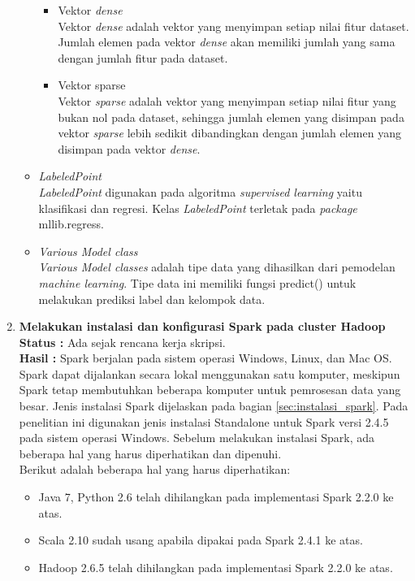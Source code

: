 \documentclass[a4paper,twoside]{article}
\begin{document}
\begin{enumerate}
\begin{itemize}
\begin{itemize}
\item Vektor \textit{dense}\\
Vektor \textit{dense} adalah vektor yang menyimpan setiap nilai fitur dataset. Jumlah elemen pada vektor \textit{dense} akan memiliki jumlah yang sama dengan jumlah fitur pada dataset.

\item Vektor sparse\\
Vektor \textit{sparse} adalah vektor yang menyimpan setiap nilai fitur yang bukan nol pada dataset, sehingga jumlah elemen yang disimpan pada vektor \textit{sparse} lebih sedikit dibandingkan dengan jumlah elemen yang disimpan pada vektor \textit{dense}. 

\end{itemize}

\item \textit{LabeledPoint}\\
\textit{LabeledPoint} digunakan pada algoritma \textit{supervised learning} yaitu klasifikasi dan regresi. Kelas \textit{LabeledPoint} terletak pada \textit{package} mllib.regress.

\item \textit{Various Model class}\\
\textit{Various Model classes} adalah tipe data yang dihasilkan dari pemodelan \textit{machine learning}. Tipe data ini memiliki fungsi predict() untuk melakukan prediksi label dan kelompok data.

\end{itemize}



\item \textbf{Melakukan instalasi dan konfigurasi Spark pada cluster Hadoop}\\
		{\bf Status :} Ada sejak rencana kerja skripsi.\\
		{\bf Hasil :} Spark berjalan pada sistem operasi Windows, Linux, dan Mac OS. Spark dapat dijalankan secara lokal menggunakan satu komputer, meskipun Spark tetap membutuhkan beberapa komputer untuk pemrosesan data yang besar. Jenis instalasi Spark dijelaskan pada bagian \ref{sec:instalasi_spark}. Pada penelitian ini digunakan jenis instalasi Standalone untuk Spark versi 2.4.5 pada sistem operasi Windows. Sebelum melakukan instalasi Spark, ada beberapa hal yang harus diperhatikan dan dipenuhi.\\

\noindent Berikut adalah beberapa hal yang harus diperhatikan:

\begin{itemize}
\item Java 7, Python 2.6 telah dihilangkan pada implementasi Spark 2.2.0 ke atas.
\item Scala 2.10 sudah usang apabila dipakai pada Spark 2.4.1 ke atas.
\item Hadoop 2.6.5 telah dihilangkan pada implementasi Spark 2.2.0 ke atas.
\end{itemize}


\end{enumerate}
\end{document}
